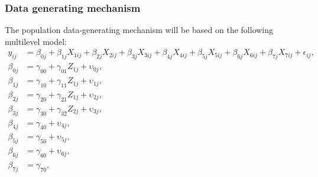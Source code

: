 \documentclass[10pt, a4paper, titlepage]{article}
\begin{document}
\subsubsection{Data generating mechanism}
The population data-generating mechanism will be based on the following multilevel model:
\begin{subequations}
\label{eq:population}
\begin{align}
y_{ij} &= \beta_{0j} + \beta_{1j}X_{1ij} + \beta_{2j}X_{2ij} + \beta_{3j}X_{3ij} + \beta_{4j}X_{4ij} + \beta_{5j}X_{5ij} + \beta_{6j}X_{6ij} + \beta_{7j}X_{7ij} + \epsilon_{ij}, \tag{4} \\
\beta_{0j} &= \gamma_{00} + \gamma_{01}Z_{1j} + \upsilon_{0j}, \tag{4.1} \\
\beta_{1j} &= \gamma_{10} + \gamma_{11}Z_{1j} + \upsilon_{1j}, \tag{4.2} \\
\beta_{2j} &= \gamma_{20} + \gamma_{21}Z_{1j} + \upsilon_{2j}, \tag{4.3} \\
\beta_{3j} &= \gamma_{30} + \gamma_{32}Z_{2j} + \upsilon_{3j}, \tag{4.4} \\
\beta_{4j} &= \gamma_{40} + \upsilon_{4j}, \tag{4.5} \\
\beta_{5j} &= \gamma_{50} + \upsilon_{5j}, \tag{4.6} \\
\beta_{6j} &= \gamma_{60} + \upsilon_{6j}, \tag{4.7} \\
\beta_{7j} &= \gamma_{70}, \tag{4.8}
\end{align}
\end{subequations}
\end{document}
